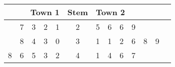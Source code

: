 \documentclass [varwidth] {standalone}
\begin{document}
\begin{table}[htbp]
\begin{tabular}{lllll|c|lllllll}
\multicolumn{5}{r|}{\textbf{Town 1}} & \textbf{Stem} & \multicolumn{6
}{l}{\textbf{Town 2}}\\[0.024cm]\hline
  & 7 & 3 & 2 & 1 & 2 & 5 & 6 & 6 & 9 &   &\\[0.124cm]
  & 8 & 4 & 3 & 0 & 3 & 1 & 1 & 2 & 6 & 8 & 9\\[0.124cm]
8 & 6 & 5 & 3 & 2 & 4 & 1 & 4 & 6 & 7 &   &\\[0.124cm]
\end{tabular}
\end{table}
\end{document}
